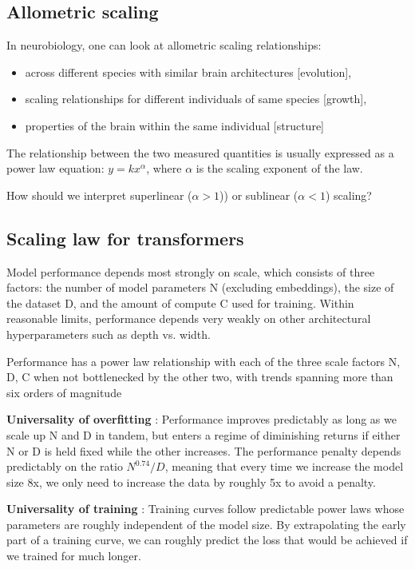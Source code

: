 \documentclass[12pt,a4paper]{article}
\begin{document}
\subsection{Allometric scaling}
In neurobiology, one can look at allometric scaling relationships:
\begin{itemize}
    \item across different species with similar brain architectures [evolution],
    \item scaling relationships for different individuals of same species [growth],
    \item properties of the brain within the same individual [structure]
\end{itemize}

The relationship between the two measured quantities is usually expressed as a power law equation: $y=kx^\alpha$, where $\alpha$ is the scaling exponent of the law. 

How should we interpret superlinear ($\alpha >1$)) or sublinear ($\alpha<1$) scaling?


\newpage
\subsection{Scaling law for transformers}
Model performance depends most strongly on scale, which consists of three factors: the number of model parameters N (excluding embeddings), the size of the dataset D, and the amount of compute C used for training. Within reasonable limits, performance depends very weakly on other architectural hyperparameters such as depth vs. width.

Performance has a power law relationship with each of the three scale factors N, D, C when not bottlenecked by the other two, with trends spanning more than six orders of magnitude


\textbf{Universality of overfitting} : Performance improves predictably as long as we scale up N and D in
tandem, but enters a regime of diminishing returns if either N or D is held fixed while the other increases. The performance penalty depends predictably on the ratio $N^0.74/D$, meaning that every time we increase the model size 8x, we only need to increase the data by roughly 5x to avoid a penalty.

\textbf{Universality of training} : Training curves follow predictable power laws whose parameters are roughly independent of the model size. By extrapolating the early part of a training curve, we can roughly predict the loss that would be achieved if we trained for much longer.
\end{document}
